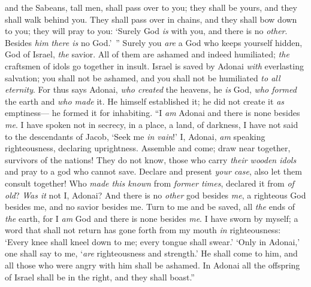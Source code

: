 \begin{biblechapter}
and the Sabeans, tall men, 
shall pass over to you; 
they shall be yours, 
and they shall walk behind you. 
They shall pass over in chains, 
and they shall bow down to you; 
they will pray to you: 
‘Surely God \textit{is} with you, and there is no \textit{other}. 
Besides \textit{him} \textit{there is} no God.’ ”
\verse Surely you \textit{are} a God who keeps yourself hidden, 
God of Israel, \textit{the} savior.
\verse All of them are ashamed and indeed humiliated; 
\textit{the} craftsmen of idols go together in insult.
\verse Israel is saved by Adonai \textit{with} everlasting salvation; 
you shall not be ashamed, 
and you shall not be humiliated \textit{to all eternity}.
\verse For thus says Adonai, \textit{who created} the heavens, 
he \textit{is} God, \textit{who formed} the earth 
and \textit{who made} it. 
He himself established it; 
he did not create it \textit{as} emptiness— 
he formed it for inhabiting. “I \textit{am} Adonai and there is none besides \textit{me}.
\verse I have spoken not in secrecy, in a place, a land, of darkness, 
I have not said to the descendants of Jacob, ‘Seek me \textit{in vain}!’ 
I, Adonai, \textit{am} speaking righteousness, 
declaring uprightness.
\verse Assemble and come; 
draw near together, survivors of the nations! 
They do not know, those who carry \textit{their wooden idols} 
and pray to a god who cannot save.
\verse Declare and present \textit{your case}, 
also let them consult together! 
Who \textit{made this known} from \textit{former times}, 
declared it from \textit{of old}? 
\textit{Was it} not I, Adonai? 
And there is no \textit{other} god besides \textit{me}, 
a righteous God besides me, 
and no savior besides me.
\verse Turn to me and be saved, all \textit{the} ends of \textit{the} earth, 
for I \textit{am} God and there is none besides \textit{me}.
\verse I have sworn by myself; 
a word that shall not return has gone forth from my mouth \textit{in} righteousness: 
‘Every knee shall kneel down to me; 
every tongue shall swear.’
\verse ‘Only in Adonai,’ one shall say to me, ‘\textit{are} righteousness and strength.’ 
He shall come to him, and all those who were angry with him shall be ashamed.
\verse In Adonai all the offspring of Israel shall be in the right, 
and they shall boast.”
\end{biblechapter}

